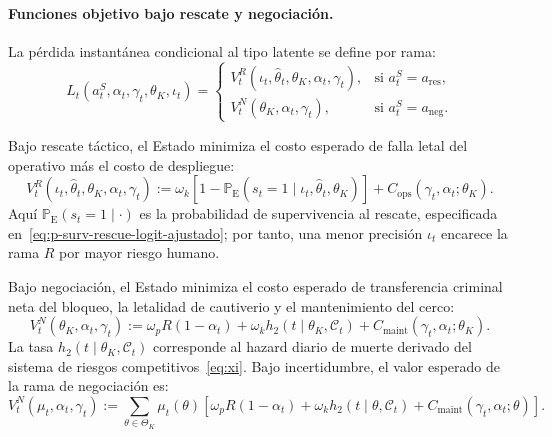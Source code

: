 \documentclass[12pt]{article}
\theoremstyle{definition}
\theoremstyle{remark}
\newcommand{\ProbE}{\mathbb{P}_{\mathrm{E}}}
\newcommand{\1}{\mathbf{1}}
\begin{document}
\paragraph{Funciones objetivo bajo rescate y negociación.}
La pérdida instantánea condicional al tipo latente se define por rama:
\begin{equation}
\label{eq:state-loss-conditional-branches}
L_t(a_t^S,\alpha_t,\gamma_t,\theta_K,\iota_t)=
\begin{cases}
V_t^R(\iota_t,\hat{\theta}_t,\theta_K,\alpha_t,\gamma_t), & \text{si } a_t^S=a_{\mathrm{res}},\\[4pt]
V_t^N(\theta_K,\alpha_t,\gamma_t), & \text{si } a_t^S=a_{\mathrm{neg}}.
\end{cases}
\end{equation}

Bajo rescate táctico, el Estado minimiza el costo esperado de falla letal del operativo más el costo de despliegue:
\begin{equation}
\label{eq:state-loss-rescue-branch}
V_t^R(\iota_t,\hat{\theta}_t,\theta_K,\alpha_t,\gamma_t)
:=
\omega_k\left[
1-\ProbE\!\left(s_t=1\mid \iota_t,\hat{\theta}_t,\theta_K\right)
\right]
+ 
C_{\mathrm{ops}}(\gamma_t,\alpha_t;\theta_K).
\end{equation}
Aquí $\ProbE(s_t=1\mid\cdot)$ es la probabilidad de supervivencia al rescate, especificada en~\eqref{eq:p-surv-rescue-logit-ajustado}; por tanto, una menor precisión $\iota_t$ encarece la rama $R$ por mayor riesgo humano.

Bajo negociación, el Estado minimiza el costo esperado de transferencia criminal neta del bloqueo, la letalidad de cautiverio y el mantenimiento del cerco:
\begin{equation}
\label{eq:state-loss-neg-branch}
V_t^N(\theta_K,\alpha_t,\gamma_t)
:=
\omega_pR(1-\alpha_t)
+\omega_k h_2(t\mid\theta_K,\mathcal C_t)
+C_{\mathrm{maint}}(\gamma_t,\alpha_t;\theta_K).
\end{equation}
La tasa $h_2(t\mid\theta_K,\mathcal C_t)$ corresponde al hazard diario de muerte derivado del sistema de riesgos competitivos~\eqref{eq:xi}. Bajo incertidumbre, el valor esperado de la rama de negociación es:
\begin{equation}
\label{eq:negotiation-cost}
V_t^N(\mu_t,\alpha_t,\gamma_t)
:=
\sum_{\theta\in\Theta_K}\mu_t(\theta)
\left[
\omega_pR(1-\alpha_t)
+\omega_k h_2(t\mid\theta,\mathcal C_t)
+C_{\mathrm{maint}}(\gamma_t,\alpha_t;\theta)
\right].
\end{equation}
\end{document}

